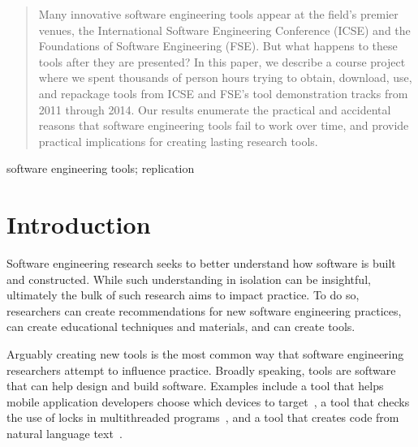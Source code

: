 \documentclass[10pt,conference]{IEEEtran}
\begin{document}
\maketitle
\begin{abstract}
Many innovative software engineering tools appear at the field's premier venues, the 
International Software Engineering Conference (ICSE) and the 
Foundations of Software Engineering (FSE).
But what happens to these tools after they are presented?
In this paper, we describe a course project where we spent 
thousands of person hours
trying to obtain, download, use, and repackage \totalToolsTried
tools from ICSE and FSE's tool demonstration tracks from
2011 through 2014.
Our results enumerate the practical and accidental reasons that
software engineering tools fail to work over time,
and provide practical implications for creating lasting 
research tools.
\end{abstract}

\begin{IEEEkeywords}
software engineering tools; replication
\end{IEEEkeywords}

\section{Introduction}

Software engineering research seeks to better
understand how software is built and constructed.
While such understanding in isolation can be insightful,
ultimately the bulk of such research 
aims to impact practice.
To do so, researchers can create recommendations
for new software engineering practices, can 
create educational techniques and materials, 
and can create tools.

Arguably creating new tools is the most common
way that software engineering researchers
attempt to influence practice.
Broadly speaking, tools are software that can
help design and build software.
Examples include a tool that helps mobile application
developers choose which devices to target~\cite{prada},
a tool that checks the use of locks in multithreaded programs~\cite{ernst},
and a tool that creates code from natural language text~\cite{desai}.
\end{document}
